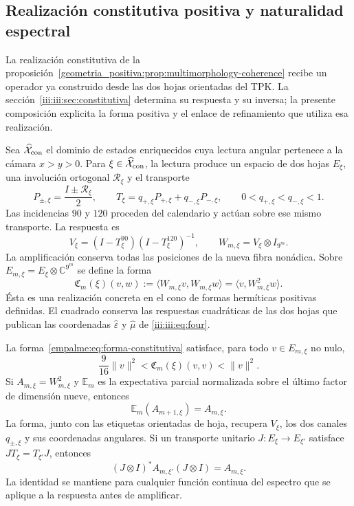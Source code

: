 \subsection{Realización constitutiva positiva y naturalidad espectral}
\label{empalme:positividad-constitutiva}

La realización constitutiva de la
proposición~\ref{geometria_positiva:prop:multimorphology-coherence} recibe
un operador ya construido desde las dos hojas orientadas del TPK. La
sección~\ref{iii:iii:sec:constitutiva} determina su respuesta y su inversa;
la presente composición explicita la forma positiva y el enlace de
refinamiento que utiliza esa realización.

Sea $\widehat{\mathcal X}_{\rm con}$ el dominio de estados enriquecidos
cuya lectura angular pertenece a la cámara $x>y>0$. Para
$\xi\in\widehat{\mathcal X}_{\rm con}$, la lectura produce un espacio
de dos hojas $E_\xi$, una involución ortogonal $\mathcal R_\xi$ y el
transporte
\[
 P_{\pm,\xi}=\frac{I\pm\mathcal R_\xi}{2},\qquad
 T_\xi=q_{+,\xi}P_{+,\xi}+q_{-,\xi}P_{-,\xi},
 \qquad 0<q_{+,\xi}<q_{-,\xi}<1.
\]
Las incidencias $90$ y $120$ proceden del calendario y actúan sobre
ese mismo transporte. La respuesta es
\[
 V_\xi=(I-T_\xi^{90})(I-T_\xi^{120})^{-1},\qquad
 W_{m,\xi}=V_\xi\otimes I_{9^m}.
\]
La amplificación conserva todas las posiciones de la nueva fibra
nonádica. Sobre $E_{m,\xi}=E_\xi\otimes\mathbb C^{9^m}$ se define
la forma
\begin{equation}
 \mathfrak C_m(\xi)(v,w)
 :=\langle W_{m,\xi}v,W_{m,\xi}w\rangle
 =\langle v,W_{m,\xi}^{2}w\rangle.
 \label{empalme:eq:forma-constitutiva}
\end{equation}
Ésta es una realización concreta en el cono de formas hermíticas
positivas definidas. El cuadrado conserva las respuestas cuadráticas
de las dos hojas que publican las coordenadas
$\widehat\varepsilon$ y $\widehat\mu$ de
\eqref{iii:iii:eq:four}.

\begin{proposition}
\label{empalme:prop:constitutiva-natural}
La forma~\eqref{empalme:eq:forma-constitutiva} satisface, para todo
$v\in E_{m,\xi}$ no nulo,
\[
 \frac9{16}\|v\|^2
 <\mathfrak C_m(\xi)(v,v)<\|v\|^2.
\]
Si $A_{m,\xi}=W_{m,\xi}^{2}$ y $\mathbb E_m$ es la expectativa
parcial normalizada sobre el último factor de dimensión nueve, entonces
\[
 \mathbb E_m(A_{m+1,\xi})=A_{m,\xi}.
\]
La forma, junto con las etiquetas orientadas de hoja, recupera
$V_\xi$, los dos canales $q_{\pm,\xi}$ y sus coordenadas angulares.
Si un transporte unitario $J:E_\xi\to E_{\xi'}$ satisface
$JT_\xi=T_{\xi'}J$, entonces
\[
 (J\otimes I)^*A_{m,\xi'}(J\otimes I)=A_{m,\xi}.
\]
La identidad se mantiene para cualquier función continua del espectro
que se aplique a la respuesta antes de amplificar.
\end{proposition}

